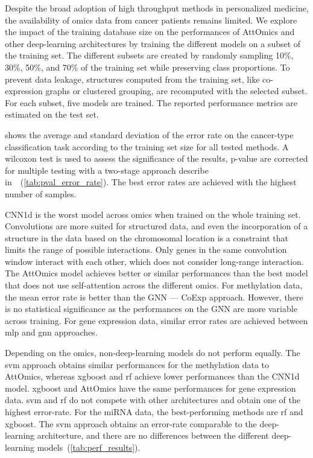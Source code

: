 \documentclass[../main.tex]{subfiles}
\begin{document}
		Despite the broad adoption of high throughput methods in personalized medicine, the availability of omics data from cancer patients remains limited.
		We explore the impact of the training database size on the performances of AttOmics and other deep-learning architectures by training the different models on a subset of the training set.
		The different subsets are created by randomly sampling 10\%, 30\%, 50\%, and 70\% of the training set while preserving class proportions.
		To prevent data leakage, structures computed from the training set, like co-expression graphs or clustered grouping, are recomputed with the selected subset.
		For each subset, five models are trained.
		The reported performance metrics are estimated on the test set.

		 shows the average and standard deviation of the error rate on the cancer-type classification task according to the training set size for all tested methods.
		A wilcoxon test is used to assess the significance of the results, p-value are corrected for multiple testing with a two-stage approach describe in~\cite{10.2307/2346101}~(\cref{tab:pval_error_rate}).
		The best error rates are achieved with the highest number of samples.

		CNN1d is the worst model across omics when trained on the whole training set.
		Convolutions are more suited for structured data, and even the incorporation of a structure in the data based on the chromosomal location is a constraint that limits the range of possible interactions.
		Only genes in the same convolution window interact with each other, which does not consider long-range interaction.
		The AttOmics model achieves better or similar performances than the best model that does not use self-attention across the different omics.
		For methylation data, the mean error rate is better than the GNN --- CoExp approach.
		However, there is no statistical significance as the performances on the GNN are more variable across training.
		For gene expression data, similar error rates are achieved between \gls{mlp} and \gls{gnn} approaches.

		Depending on the omics, non-deep-learning models do not perform equally.
		The \gls{svm} approach obtains similar performances for the methylation data to AttOmics, whereas \gls{xgboost} and \gls{rf} achieve lower performances than the CNN1d model.
		\gls{xgboost} and AttOmics have the same performances for gene expression data.
		\gls{svm} and \gls{rf} do not compete with other architectures and obtain one of the highest error-rate.
		For the miRNA data, the best-performing methods are \gls{rf} and \gls{xgboost}.
		The \gls{svm} approach obtains an error-rate comparable to the deep-learning architecture, and there are no differences between the different deep-learning models~(\cref{tab:perf_results}).
\end{document}
